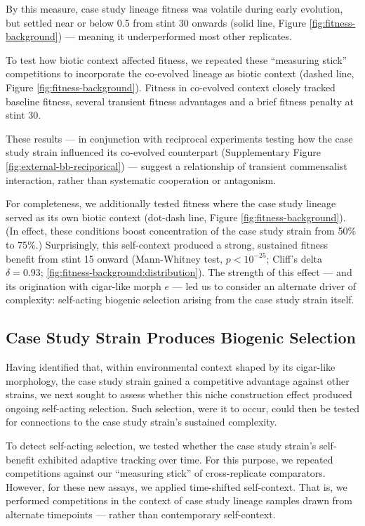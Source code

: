 By this measure, case study lineage fitness was volatile during early evolution, but settled near or below 0.5 from stint 30 onwards (solid line, Figure \ref{fig:fitness-background}) --- meaning it underperformed most other replicates.

To test how biotic context affected fitness, we repeated these ``measuring stick'' competitions to incorporate the co-evolved lineage as biotic context (dashed line, Figure \ref{fig:fitness-background}).
Fitness in co-evolved context closely tracked baseline fitness, several transient fitness advantages and a brief fitness penalty at stint 30.

These results --- in conjunction with reciprocal experiments testing how the case study strain influenced its co-evolved counterpart (Supplementary Figure \ref{fig:external-bb-reciporical}) --- suggest a relationship of transient commensalist interaction, rather than systematic cooperation or antagonism.

For completeness, we additionally tested fitness where the case study lineage served as its own biotic context (dot-dash line, Figure \ref{fig:fitness-background}).
(In effect, these conditions boost concentration of the case study strain from 50\% to 75\%.)
Surprisingly, this self-context produced a strong, sustained fitness benefit from stint 15 onward (Mann-Whitney test, $p < 10^{-25}$; Cliff's delta $\delta=0.93$; \ref{fig:fitness-background:distribution}).
The strength of this effect --- and its origination with cigar-like morph $e$ --- led us to consider an alternate driver of complexity: self-acting biogenic selection arising from the case study strain itself.

\subsection{Case Study Strain Produces Biogenic Selection}



Having identified that, within environmental context shaped by its cigar-like morphology, the case study strain gained a competitive advantage against other strains, we next sought to assess whether this niche construction effect produced ongoing self-acting selection.
Such selection, were it to occur, could then be tested for connections to the case study strain's sustained complexity.

To detect self-acting selection, we tested whether the case study strain's self-benefit exhibited adaptive tracking over time.
For this purpose, we repeated competitions against our ``measuring stick'' of cross-replicate comparators.
However, for these new assays, we applied time-shifted self-context.
That is, we performed competitions in the context of case study lineage samples drawn from alternate timepoints --- rather than contemporary self-context.

